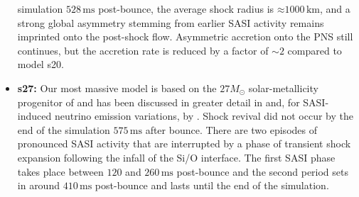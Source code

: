\begin{itemize}
simulation $528 \, \mathrm{ms}$ post-bounce, the average shock
radius is $\mathord{\approx} 1000 \, \mathrm{km}$, and a strong global
asymmetry stemming from earlier SASI activity remains imprinted onto the post-shock flow. Asymmetric accretion onto the PNS still continues, but the accretion rate is reduced by a factor of $\mathord{\sim} 2$
compared to model s20.
\item \textbf{s27:} Our most massive model is based on the 
$27 M_\odot$ solar-metallicity progenitor of \citet{woosley_02} and has been
discussed in greater detail in \citet{hanke_13} and, for SASI-induced neutrino emission variations, by \citet{tamborra_13,tamborra_14b}.
Shock revival did not occur by the end of the simulation $575 \, \mathrm{ms}$ after
bounce. There are two episodes of pronounced SASI activity that are
interrupted by a phase of transient shock expansion following the
infall of the Si/O interface. The first SASI phase takes place
between $120$ and $260 \, \mathrm{ms}$ post-bounce and the second
period sets in around $410 \, \mathrm{ms}$ post-bounce and lasts until
the end of the simulation. 
\end{itemize}

